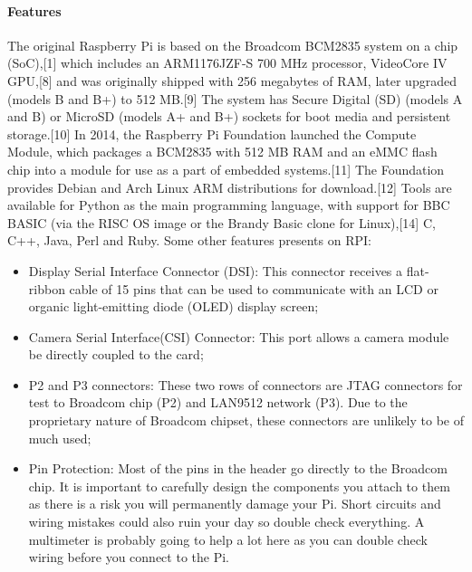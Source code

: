 \documentclass{acm_proc_article-sp}
\begin{document}
\paragraph{Features}
The original Raspberry Pi is based on the Broadcom BCM2835 system on a chip (SoC),[1] which includes an ARM1176JZF-S 700 MHz processor, VideoCore IV GPU,[8] and was originally shipped with 256 megabytes of RAM, later upgraded (models B and B+) to 512 MB.[9] The system has Secure Digital (SD) (models A and B) or MicroSD (models A+ and B+) sockets for boot media and persistent storage.[10]
\newline
\newline
In 2014, the Raspberry Pi Foundation launched the Compute Module, which packages a BCM2835 with 512 MB RAM and an eMMC flash chip into a module for use as a part of embedded systems.[11]
The Foundation provides Debian and Arch Linux ARM distributions for download.[12] Tools are available for Python as the main programming language, with support for BBC BASIC (via the RISC OS image or the Brandy Basic clone for Linux),[14] C, C++, Java, Perl and Ruby.
\newline
\newline
Some other features presents on RPI:
\begin{itemize}
\item Display Serial Interface Connector (DSI): This connector receives a flat-ribbon cable of 15 pins that can be used to communicate with an LCD or organic light-emitting diode (OLED) display screen;	
\item Camera Serial Interface(CSI) Connector: This port allows a camera module be directly coupled to the card;
\item P2 and P3 connectors: These two rows of connectors are JTAG connectors for test to Broadcom chip (P2) and LAN9512 network (P3). Due to the proprietary nature of Broadcom chipset, these connectors are unlikely to be of much used;
\item Pin Protection: Most of the pins in the header go directly to the Broadcom chip. It is important to carefully design the components you attach to them as there is a risk you will permanently damage your Pi. Short circuits and wiring mistakes could also ruin your day so double check everything. A multimeter is probably going to help a lot here as you can double check wiring before you connect to the Pi.
\end{itemize}
\end{document}
